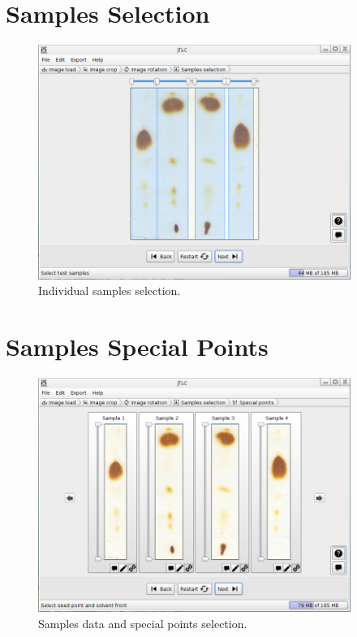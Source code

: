 \section{Samples Selection}
\begin{figure}[H]
	\vspace{0cm}
	\centering
	\includegraphics[width=385px]{imagenes/selection}
	\centering
	\vspace{-0.4cm}
	\caption{Individual samples selection.}
	\label{fig:image_samples_selection}
	\vspace{-0.25cm}
\end{figure}

\section{Samples Special Points}
\begin{figure}[H]
	\vspace{0cm}
	\centering
	\includegraphics[width=385px]{imagenes/points}
	\centering
	\vspace{-0.4cm}
	\caption{Samples data and special points selection.}
	\label{fig:image_samples_special_points}
	\vspace{-0.25cm}
\end{figure}


